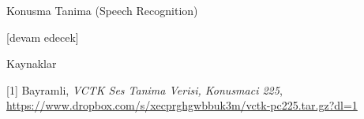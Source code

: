 \documentclass[12pt,fleqn]{article}\usepackage{../../common}
\begin{document}
Konusma Tanima (Speech Recognition)









[devam edecek]

Kaynaklar

[1] Bayramli, {\em VCTK Ses Tanima Verisi, Konusmaci 225}, \url{https://www.dropbox.com/s/xecprghgwbbuk3m/vctk-pc225.tar.gz?dl=1}
\end{document}
